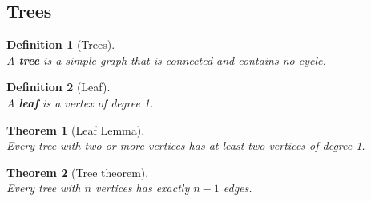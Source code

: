 \documentclass[12pt]{article}
\newtheorem{definition}{Definition}[section]
\newtheorem{theorem}{Theorem}[section]
\theoremstyle{definition}
\begin{document}
\subsection{Trees}
\begin{definition}[Trees]
\hfill\\\normalfont A \textbf{tree} is a simple graph that is connected and contains no cycle.
\end{definition}
\begin{definition}[Leaf]
\hfill\\\normalfont A \textbf{leaf} is a vertex of degree 1.
\end{definition}
\begin{theorem}[Leaf Lemma]
\hfill\\\normalfont Every tree with two or more vertices has at least two vertices of degree 1.
\end{theorem}
\begin{theorem}[Tree theorem]
\hfill\\\normalfont Every tree with $n$ vertices has exactly $n-1$ edges.
\end{theorem}
\end{document}
